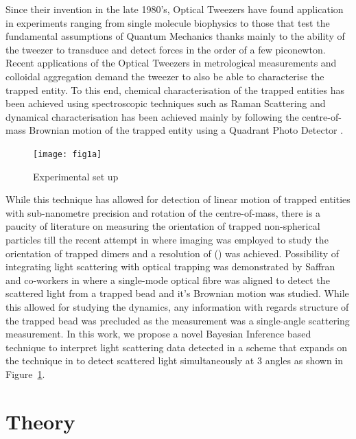 \documentclass[preprint,3p]{elsarticle}
\begin{document}
\indent Since their invention in the late 1980's, Optical Tweezers have found application in experiments ranging from single molecule biophysics \cite{Bustamante2021Biophysics} to those that test the fundamental assumptions of Quantum Mechanics  \cite{yin2013large} thanks mainly to the ability of the tweezer to transduce and detect forces in the order of a few piconewton. Recent applications of the Optical Tweezers in metrological measurements \cite{arita2020coherent} and colloidal aggregation \cite{burns1990optical} demand the tweezer to also be able to characterise  the trapped entity. To this end, chemical characterisation of the trapped entities has been achieved using spectroscopic techniques such as Raman Scattering \cite{gupta2014raman} and dynamical characterisation has been achieved mainly by following the centre-of-mass Brownian motion of the trapped entity using a Quadrant Photo Detector \cite{friedrich2012tuning}. 
\begin{figure}
	\centering
	\texttt{[image: fig1a]}
	\caption{Experimental set up}
	\label{fig:1}
	\vspace{-100pt}
\end{figure}
While this technique has allowed for detection of linear motion of trapped entities  with sub-nanometre precision \cite{friedrich2012tuning} and  rotation \cite{yifat2021facile} of the centre-of-mass, there is a paucity of literature on measuring the orientation of trapped non-spherical particles till the recent attempt in \cite{raudsepp2022estimating} where imaging was employed to study the orientation of trapped dimers and a resolution of () was achieved.   
Possibility of integrating light scattering with optical trapping was demonstrated by Saffran and co-workers in \cite{Bar-Ziv_1998} where a single-mode optical fibre was aligned to detect the scattered light from a trapped bead and it's Brownian motion was studied. While this allowed for studying the dynamics, any information with regards structure of the trapped bead was precluded as the measurement was a single-angle scattering measurement.
\newpage
In this work, we propose a novel Bayesian Inference based technique to interpret light scattering data detected in a scheme that expands on the technique in \cite{Bar-Ziv_1998} to detect scattered light simultaneously at 3 angles as shown in Figure~\ref{fig:1}.  

\section{Theory}
\label{sec:Theory}
\end{document}
